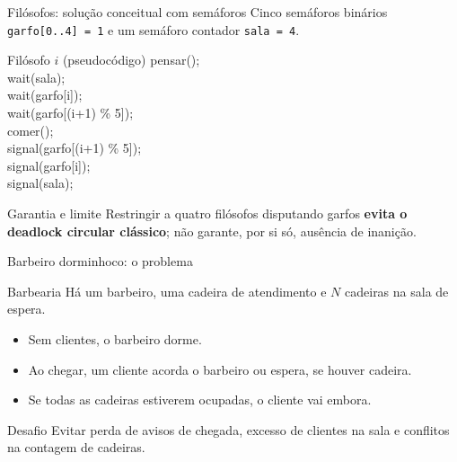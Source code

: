 \documentclass[aspectratio=169,11pt]{beamer}
\begin{document}
\begin{frame}[fragile]{Filósofos: solução conceitual com semáforos}
\small
Cinco semáforos binários \texttt{garfo[0..4] = 1} e um semáforo contador \texttt{sala = 4}.
\vspace{0.2cm}
\begin{block}{Filósofo $i$ (pseudocódigo)}
\ttfamily\small
pensar();\\
wait(sala);\\
wait(garfo[i]);\\
wait(garfo[(i+1) \% 5]);\\
comer();\\
signal(garfo[(i+1) \% 5]);\\
signal(garfo[i]);\\
signal(sala);
\end{block}
\begin{alertblock}{Garantia e limite}
Restringir a quatro filósofos disputando garfos \textbf{evita o deadlock circular clássico}; não garante, por si só, ausência de inanição.
\end{alertblock}
\end{frame}



\begin{frame}{Barbeiro dorminhoco: o problema}
\begin{block}{Barbearia}
Há um barbeiro, uma cadeira de atendimento e $N$ cadeiras na sala de espera.
\end{block}
\begin{itemize}
\item Sem clientes, o barbeiro dorme.
\item Ao chegar, um cliente acorda o barbeiro ou espera, se houver cadeira.
\item Se todas as cadeiras estiverem ocupadas, o cliente vai embora.
\end{itemize}
\vspace{0.2cm}
\begin{alertblock}{Desafio}
Evitar perda de avisos de chegada, excesso de clientes na sala e conflitos na contagem de cadeiras.
\end{alertblock}
\end{frame}
\end{document}

